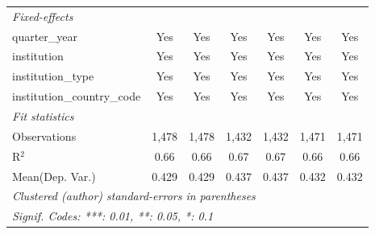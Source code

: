 \begin{tabular}{lcccccc}
   \midrule
   \emph{Fixed-effects}\\
   quarter\_year                      & Yes     & Yes         & Yes     & Yes     & Yes     & Yes\\  
   institution                        & Yes     & Yes         & Yes     & Yes     & Yes     & Yes\\  
   institution\_type                  & Yes     & Yes         & Yes     & Yes     & Yes     & Yes\\  
   institution\_country\_code         & Yes     & Yes         & Yes     & Yes     & Yes     & Yes\\  
   \midrule
   \emph{Fit statistics}\\
   Observations                       & 1,478   & 1,478       & 1,432   & 1,432   & 1,471   & 1,471\\  
   R$^2$                              & 0.66    & 0.66        & 0.67    & 0.67    & 0.66    & 0.66\\  
Mean(Dep. Var.) & 0.429 & 0.429 & 0.437 & 0.437 & 0.432 & 0.432 \\
   \midrule \midrule
   \multicolumn{7}{l}{\emph{Clustered (author) standard-errors in parentheses}}\\
   \multicolumn{7}{l}{\emph{Signif. Codes: ***: 0.01, **: 0.05, *: 0.1}}\\
\end{tabular}
\par\endgroup
